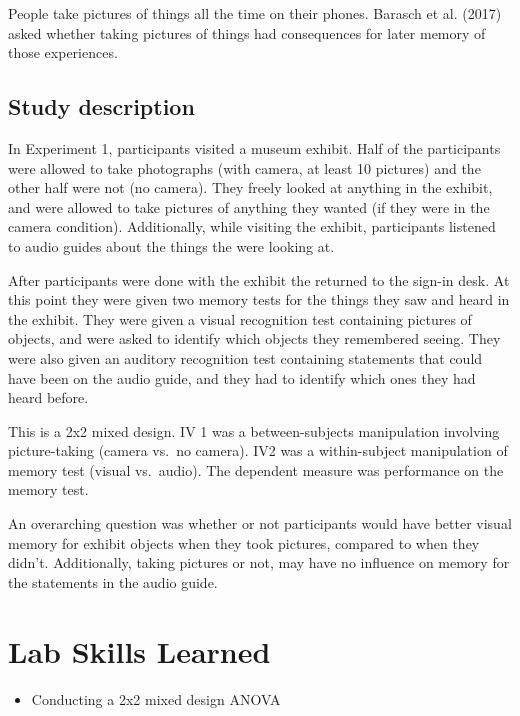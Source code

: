\documentclass[]{book}
\providecommand{\tightlist}{%
  \setlength{\itemsep}{0pt}\setlength{\parskip}{0pt}}
\begin{document}
People take pictures of things all the time on their phones. Barasch et
al. (2017) asked whether taking pictures of things had consequences for
later memory of those experiences.

\subsection{Study description}\label{study-description-5}

In Experiment 1, participants visited a museum exhibit. Half of the
participants were allowed to take photographs (with camera, at least 10
pictures) and the other half were not (no camera). They freely looked at
anything in the exhibit, and were allowed to take pictures of anything
they wanted (if they were in the camera condition). Additionally, while
visiting the exhibit, participants listened to audio guides about the
things the were looking at.

After participants were done with the exhibit the returned to the
sign-in desk. At this point they were given two memory tests for the
things they saw and heard in the exhibit. They were given a visual
recognition test containing pictures of objects, and were asked to
identify which objects they remembered seeing. They were also given an
auditory recognition test containing statements that could have been on
the audio guide, and they had to identify which ones they had heard
before.

This is a 2x2 mixed design. IV 1 was a between-subjects manipulation
involving picture-taking (camera vs.~no camera). IV2 was a
within-subject manipulation of memory test (visual vs.~audio). The
dependent measure was performance on the memory test.

An overarching question was whether or not participants would have
better visual memory for exhibit objects when they took pictures,
compared to when they didn't. Additionally, taking pictures or not, may
have no influence on memory for the statements in the audio guide.

\section{Lab Skills Learned}\label{lab-skills-learned-5}

\begin{itemize}
\tightlist
\item
  Conducting a 2x2 mixed design ANOVA
\end{itemize}
\end{document}
